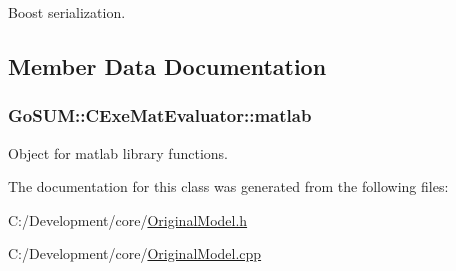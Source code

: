 Boost serialization. 



\subsection{Member Data Documentation}
\hypertarget{class_go_s_u_m_1_1_c_exe_mat_evaluator_a23d92a4142a9809c0acd60dfbb33b629}{
\subsubsection[{matlab}]{ Go\-S\-U\-M\-::\-C\-Exe\-Mat\-Evaluator\-::matlab\hspace{0.3cm}{\ttfamily [protected]}}}\label{class_go_s_u_m_1_1_c_exe_mat_evaluator_a23d92a4142a9809c0acd60dfbb33b629}
Object for matlab library functions. 

The documentation for this class was generated from the following files\-:\begin{DoxyCompactItemize}
\item 
C\-:/\-Development/core/\hyperlink{_original_model_8h}{Original\-Model.\-h}\item 
C\-:/\-Development/core/\hyperlink{_original_model_8cpp}{Original\-Model.\-cpp}\end{DoxyCompactItemize}
